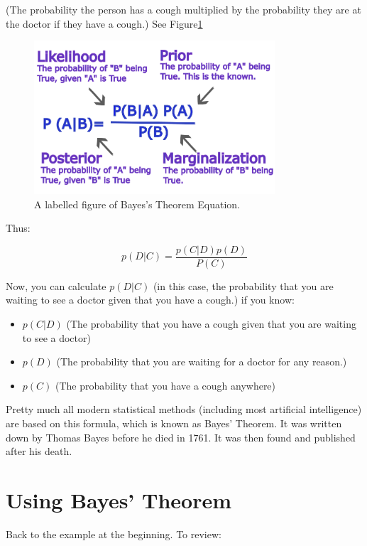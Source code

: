 (The probability the person has a cough multiplied by the probability they are at the doctor if they have a cough.) See Figure\ref{fig:bayes1}
\begin{figure}[htbp]
    \centering
    \includegraphics[width=0.8\textwidth]{Probability.png}
    \caption{A labelled figure of Bayes's Theorem Equation.}
    \label{fig:bayes1}
\end{figure}

Thus:

$$p(D | C) = \frac {p(C | D)p(D)}{P(C)}$$

Now, you can calculate $p(D | C)$ (in this case, the probability that
you are waiting to see a doctor given that you have a cough.) if you
know:

\begin{itemize}
\item $p(C | D)$ (The probability that you have a cough given that you are waiting to see a doctor)
\item $p(D)$ (The probability that you are waiting for a doctor for any reason.)
\item $p(C)$ (The probability that you have a cough anywhere)
\end{itemize}

Pretty much all modern statistical methods (including most artificial
intelligence) are based on this formula, which is known as Bayes'
Theorem. It was written down by Thomas Bayes before he died in
1761. It was then found and published after his death.

\section{Using Bayes' Theorem}

Back to the example at the beginning. To review:

